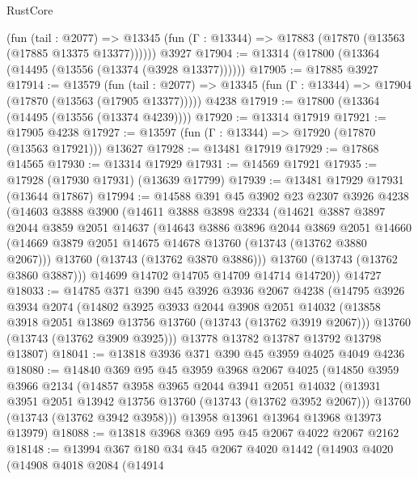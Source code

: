 \begin{lexlean}{RustCore}
\begin{coremodule}
      (fun (tail : @2077) =>
      @13345 (fun (Γ : @13344) => @17883 (@17870 (@13563 (@17885 @13375 @13377))))))
    @3927
@17904 := @13314 (@17800 (@13364 (@14495 (@13556 (@13374 (@3928 @13377))))))
@17905 := @17885 @3927
@17914 := @13579
    (fun (tail : @2077) => @13345 (fun (Γ : @13344) => @17904 (@17870 (@13563 (@17905 @13377)))))
    @4238
@17919 := @17800 (@13364 (@14495 (@13556 (@13374 @4239))))
@17920 := @13314 @17919
@17921 := @17905 @4238
@17927 := @13597 (fun (Γ : @13344) => @17920 (@17870 (@13563 @17921))) @13627
@17928 := @13481 @17919
@17929 := @17868 @14565
@17930 := @13314 @17929
@17931 := @14569 @17921
@17935 := @17928 (@17930 @17931) (@13639 @17799)
@17939 := @13481 @17929 @17931 (@13644 @17867)
@17994 := @14588
    @391
    @45
    @3902
    @23
    @2307
    @3926
    @4238
    (@14603
      @3888
      @3900
      (@14611
        @3888
        @3898
        @2334
        (@14621
          @3887
          @3897
          @2044
          @3859
          @2051
          @14637
          (@14643
            @3886
            @3896
            @2044
            @3869
            @2051
            @14660
            (@14669 @3879 @2051 @14675 @14678 @13760 (@13743 (@13762 @3880 @2067)))
            @13760
            (@13743 (@13762 @3870 @3886)))
          @13760
          (@13743 (@13762 @3860 @3887)))
        @14699
        @14702
        @14705
        @14709
        @14714
        @14720))
    @14727
@18033 := @14785
    @371
    @390
    @45
    @3926
    @3936
    @2067
    @4238
    (@14795
      @3926
      @3934
      @2074
      (@14802
        @3925
        @3933
        @2044
        @3908
        @2051
        @14032
        (@13858 @3918 @2051 @13869 @13756 @13760 (@13743 (@13762 @3919 @2067)))
        @13760
        (@13743 (@13762 @3909 @3925)))
      @13778
      @13782
      @13787
      @13792
      @13798
      @13807)
@18041 := @13818 @3936 @371 @390 @45 @3959 @4025 @4049 @4236
@18080 := @14840
    @369
    @95
    @45
    @3959
    @3968
    @2067
    @4025
    (@14850
      @3959
      @3966
      @2134
      (@14857
        @3958
        @3965
        @2044
        @3941
        @2051
        @14032
        (@13931 @3951 @2051 @13942 @13756 @13760 (@13743 (@13762 @3952 @2067)))
        @13760
        (@13743 (@13762 @3942 @3958)))
      @13958
      @13961
      @13964
      @13968
      @13973
      @13979)
@18088 := @13818 @3968 @369 @95 @45 @2067 @4022 @2067 @2162
@18148 := @13994
    @367
    @180
    @34
    @45
    @2067
    @4020
    @1442
    (@14903
      @4020
      (@14908
        @4018
        @2084
        (@14914

\end{coremodule}
\end{lexlean}
